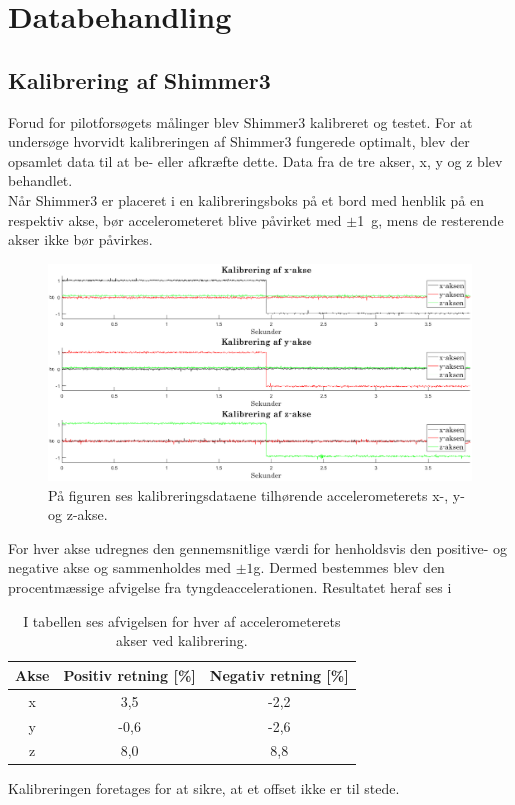 \section{Databehandling}
\subsection{Kalibrering af Shimmer3}
Forud for pilotforsøgets målinger blev Shimmer3 kalibreret og testet. For at undersøge hvorvidt kalibreringen af Shimmer3 fungerede optimalt, blev der opsamlet data til at be- eller afkræfte dette. Data fra de tre akser, x, y og z blev behandlet. \\
Når Shimmer3 er placeret i en kalibreringsboks på et bord med henblik på en respektiv akse, bør accelerometeret blive påvirket med $\pm$1~g, mens de resterende akser ikke bør påvirkes.
\begin{figure}[H]
	\centering
	\includegraphics[scale=0.68]{figures/qBilag/kalibreringsdata}
	\caption{På figuren ses kalibreringsdataene tilhørende accelerometerets x-, y- og z-akse.}
	\label{fig:Ap_Kalibrering}
\end{figure}
For hver akse udregnes den gennemsnitlige værdi for henholdsvis den positive- og negative akse og sammenholdes med $\pm 1$g. Dermed bestemmes blev den procentmæssige afvigelse fra tyngdeaccelerationen. Resultatet heraf ses i 
\begin{table}[H]
	\centering
	\begin{tabular}{ccc}		\hline
		\rowcolor[HTML]{C0C0C0} Akse & Positiv retning {[}\%{]} & Negativ retning {[}\%{]} \\ \hline
		x & 3,5 & -2,2 \\ \hline
		y & -0,6 & -2,6 \\ \hline
		z & 8,0 & 8,8 \\ \hline
	\end{tabular}
	\caption{I tabellen ses afvigelsen for hver af accelerometerets akser ved kalibrering.}
	\label{fig:akser_pilot}
\end{table}\vspace{-.25cm}
Kalibreringen foretages for at sikre, at et offset ikke er til stede. 

